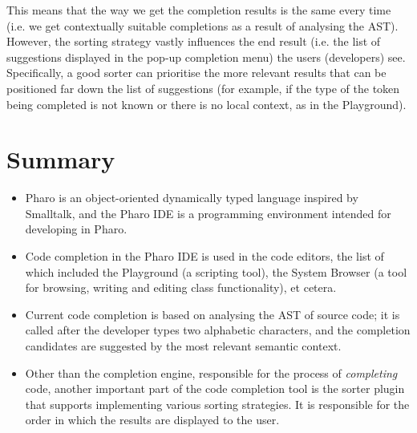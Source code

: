 This means that the way we get the completion results is the same every time (i.e. we get contextually suitable completions as a result of analysing the AST). However, the sorting strategy vastly influences the end result (i.e. the list of suggestions displayed in the pop-up completion menu) the users (developers) see. Specifically, a good sorter can prioritise the more relevant results that can be positioned far down the list of suggestions (for example, if the type of the token being completed is not known or there is no local context, as in the Playground).

\section{Summary}
\label{sec:PharoCompletion-Summary}
\begin{itemize}
    \item Pharo is an object-oriented dynamically typed language inspired by Smalltalk, and the Pharo IDE is a programming environment intended for developing in Pharo.
    \item Code completion in the Pharo IDE is used in the code editors, the list of which included the Playground (a scripting tool), the System Browser (a tool for browsing, writing and editing class functionality), et cetera.
    \item Current code completion is based on analysing the AST of source code; it is called after the developer types two alphabetic characters, and the completion candidates are suggested by the most relevant semantic context.
    \item Other than the completion engine, responsible for the process of \textit{completing} code, another important part of the code completion tool is the sorter plugin that supports implementing various sorting strategies. It is responsible for the order in which the results are displayed to the user.
\end{itemize}